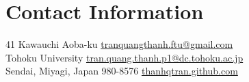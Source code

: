 \section{\sc Contact Information}
41 Kawauchi Aoba-ku      \hfill  \href{mailto:tranquangthanh.ftu@gmail.com}{tranquangthanh.ftu@gmail.com}\\
Tohoku University  	 		\hfill \href{mailto:tran.quang.thanh.p1@dc.tohoku.ac.jp}{tran.quang.thanh.p1@dc.tohoku.ac.jp}\\
Sendai, Miyagi, Japan 980-8576 \hfill \href{https://thanhqtran.github.com}{thanhqtran.github.com}   


